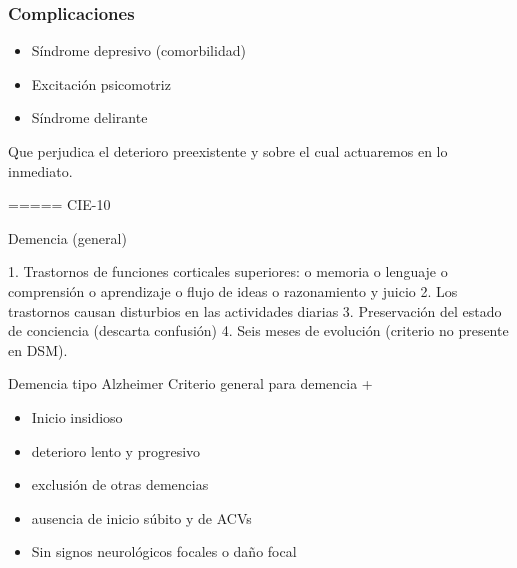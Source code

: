 \subsubsection*{Complicaciones}
\begin{itemize}
	\item Síndrome depresivo (comorbilidad)
	\item Excitación psicomotriz
	\item Síndrome delirante
\end{itemize}
Que perjudica el deterioro preexistente y sobre el cual actuaremos en lo inmediato.

===== CIE-10

Demencia (general)

1. Trastornos de funciones corticales superiores: o memoria o lenguaje o comprensión o aprendizaje o flujo de ideas o razonamiento y juicio
2. Los trastornos causan disturbios en las actividades diarias
3. Preservación del estado de conciencia (descarta confusión)
4. Seis meses de evolución (criterio no presente en DSM).

Demencia tipo Alzheimer Criterio general para demencia +
\begin{itemize}
	\item Inicio insidioso
	\item deterioro lento y progresivo
	\item exclusión de otras demencias
	\item ausencia de inicio súbito y de ACVs
	\item Sin signos neurológicos focales o daño focal
\end{itemize}
